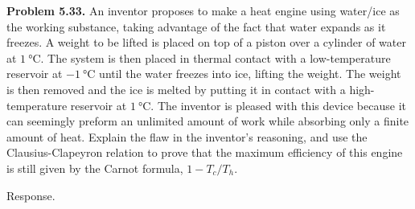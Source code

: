 \documentclass[a4paper, 12pt]{config/homework}
\begin{document}
\pagebreak\noindent
\textbf{Problem 5.33.} An inventor proposes to make a heat engine using water/ice as the working substance, taking advantage of the fact that water expands as it freezes. A weight to be lifted is placed on top of a piston over a cylinder of water at \(\qty{1}{\celsius}\). The system is then placed in thermal contact with a low-temperature reservoir at \(\qty{-1}{\celsius}\) until the water freezes into ice, lifting the weight. The weight is then removed and the ice is melted by putting it in contact with a high-temperature reservoir at \(\qty{1}{\celsius}\). The inventor is pleased with this device because it can seemingly preform an unlimited amount of work while absorbing only a finite amount of heat. Explain the flaw in the inventor's reasoning, and use the Clausius-Clapeyron relation to prove that the maximum efficiency of this engine is still given by the Carnot formula, \(1 - T_c/T_h\).

\bigskip\noindent
Response.
\end{document}
